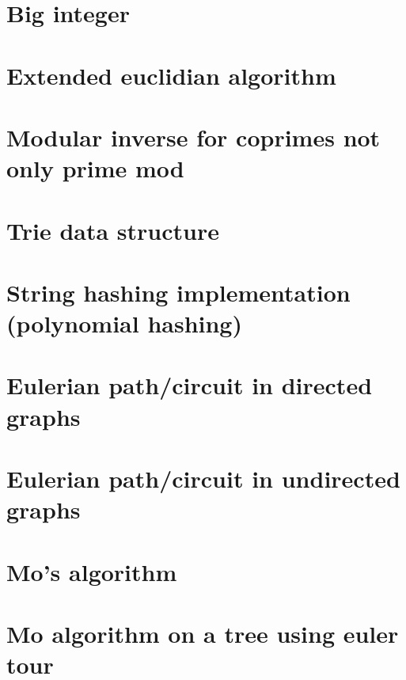 \section{Big integer}
\raggedbottom

\section{Extended euclidian algorithm}
\raggedbottom

\section{Modular inverse for coprimes not only prime mod}
\raggedbottom

\section{Trie data structure}
\raggedbottom

\section{String hashing implementation (polynomial hashing)}
\raggedbottom

\section{Eulerian path/circuit in directed graphs}
\raggedbottom

\section{Eulerian path/circuit in undirected graphs}
\raggedbottom

\section{Mo's algorithm}
\raggedbottom

\section{Mo algorithm on a tree using euler tour}
\raggedbottom

